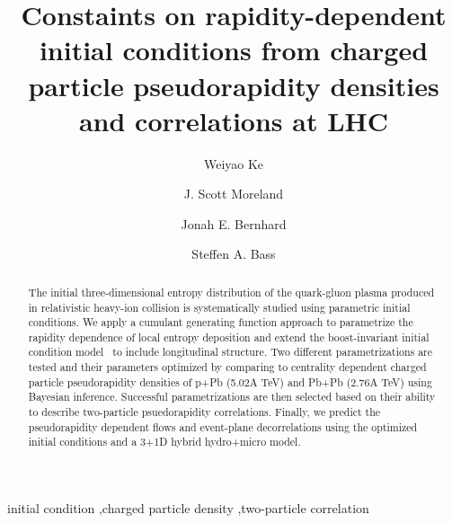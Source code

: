 \documentclass[3p,times,twocolumn]{elsarticle}
\begin{document}
\begin{frontmatter}



\dochead{}

\title{Constaints on rapidity-dependent initial conditions from charged particle pseudorapidity densities and correlations at LHC}


\author{Weiyao Ke}
\author{J. Scott Moreland}
\author{Jonah E. Bernhard}
\author{Steffen A. Bass}

\address{Department of Physics, Duke University, Durham, NC 27708-0305, United States}

\begin{abstract}
The initial three-dimensional entropy distribution of the quark-gluon plasma produced in relativistic heavy-ion collision is systematically studied using parametric initial conditions.
We apply a cumulant generating function approach to parametrize the rapidity dependence of local entropy deposition and extend the boost-invariant initial condition model \trento~to include longitudinal structure.
Two different parametrizations are tested and their parameters optimized by comparing to centrality dependent charged particle pseudorapidity densities of p+Pb (5.02A TeV) and Pb+Pb (2.76A TeV) using Bayesian inference.
Successful parametrizations are then selected based on their ability to describe two-particle psuedorapidity correlations.
Finally, we predict the pseudorapidity dependent flows and event-plane decorrelations using the optimized initial conditions and a 3+1D hybrid hydro+micro model.

\end{abstract}

\begin{keyword}
initial condition \sep charged particle density \sep two-particle correlation


\end{keyword}

\end{frontmatter}
\end{document}
